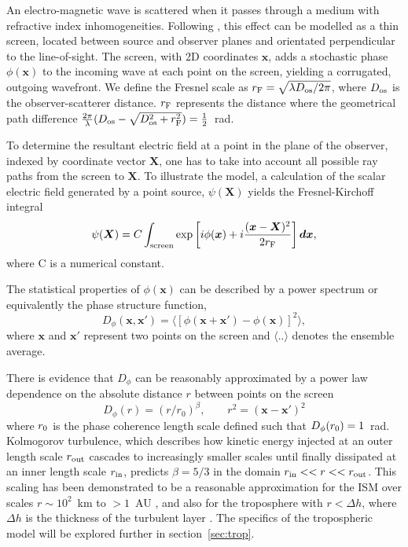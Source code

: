 An electro-magnetic wave is scattered when it passes through a medium with refractive index inhomogeneities. Following \citet{Narayan_1992}, this effect can be modelled as a thin screen, located between source and observer planes and orientated perpendicular to the line-of-sight. The screen, with 2D coordinates $\mathbf{x}$, adds a stochastic phase $\phi(\mathbf{x})$ to the incoming wave at each point on the screen, yielding a corrugated, outgoing wavefront. We define the Fresnel scale as  $r_{\rm F} = \sqrt{\lambda D_{\rm os}/2\pi}$, where $D_{\rm os}$ is the observer-scatterer distance.  $r_{\rm F}$ represents the distance where the geometrical path difference $\frac{2\pi}{\lambda} (D_{\rm os} - \sqrt{D_{\rm os}^2 + r_{\rm F}^2}) =\frac{1}{2}$~rad.

To determine the resultant electric field at a point in the plane of the observer, indexed by coordinate vector $\bm{X}$, one has to take into account all possible ray paths from the screen to $\bm{X}$. To illustrate the model, a calculation of the scalar electric field generated by a point source, $\psi(\bm{X})$ yields the Fresnel-Kirchoff integral \citep*{BORN_1980}
\begin{equation}\label{Fresnel- Kirchoff}
\psi(\boldsymbol{X}) = C \int_{\rm screen} \exp\left[i\phi(\boldsymbol{x}) + i \frac{(\boldsymbol{x}-\boldsymbol{X})^2}{2 r_{\rm F}}\right]\boldsymbol{dx},
\end{equation}
where C is a numerical constant.

The statistical properties of $\phi(\mathbf{x})$ can be described by a power spectrum or equivalently the phase structure function,
\begin{equation}\label{eq:D_phi}
D_\phi (\mathbf{x},\mathbf{x'}) = \langle \left[ \phi(\mathbf{x} +\mathbf{x'}) - \phi(\mathbf{x})\right]^2 \rangle,
\end{equation}
where $\mathbf{x}$ and $\mathbf{x'} $ represent two points on the screen and $\langle .. \rangle$ denotes the ensemble average. 

There is evidence that $D_\phi$ can be reasonably approximated by a power law dependence on the absolute distance $r$ between points on the screen  \citep{Armstrong_1995,Carilli_1997}
\begin{equation}
D_\phi (r) =  (r/r_0)^\beta,\qquad r^2 = (\mathbf{x} - \mathbf{x'})^2
\label{kolmogorov}
\end{equation}
where $r_{\rm 0}$ is the phase coherence length scale defined such that $D_\phi(r_{\rm 0}) = 1$~rad. 
Kolmogorov turbulence, which describes how kinetic energy injected at an outer length scale $r_{\rm out}$ cascades to increasingly smaller scales until finally dissipated at an inner length scale $r_{\rm in}$, predicts $\beta = 5/3$ in the domain ${r_{\rm in}<<r<<r_{\rm out}}$. This scaling has been demonstrated to be a reasonable approximation for the ISM over scales $r \sim 10^2$~km to $>1$~AU \citep*{Johnson_2015a}, and also for the troposphere with $r< \Delta h$, where $\Delta h$ is the thickness of the turbulent layer \cite{Coulman_1985}. The specifics of the tropospheric model will be explored further in section~\ref{sec:trop}.

